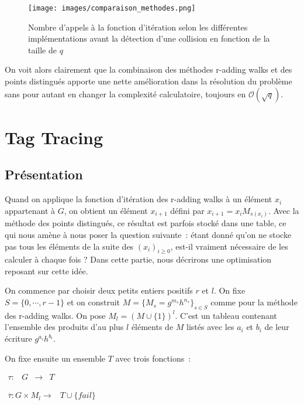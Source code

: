     \begin{figure}
      \center{}
      \texttt{[image: images/comparaison\_methodes.png]}
      \caption{Nombre d'appels à la fonction d'itération selon les différentes implémentations avant la détection d'une collision en fonction de la taille de $q$}
      \label{fig:comparatif}
    \end{figure}

    On voit alors clairement que la combinaison des méthodes r-adding walks et des points distingués apporte une nette amélioration dans la résolution du problème sans pour autant en changer la complexité calculatoire, toujours en $\mathcal{O}(\sqrt{q})$.


    \section{Tag Tracing}
      \subsection{Présentation}
      Quand on applique la fonction d'itération des r-adding walks à un élément $x_i$ appartenant à $G$, on obtient un élément $x_{i+1}$ défini par $x_{i+1} = x_i M_{s(x_i)}$. Avec la méthode des points distingués, ce résultat est parfois stocké dans une table, ce qui nous amène à nous poser la question suivante~: étant donné qu'on ne stocke pas tous les éléments de la suite des $(x_i)_{i \ge 0}$, est-il vraiment nécessaire de les calculer à chaque fois ? Dans cette partie, nous décrirons une optimisation reposant sur cette idée.

      On commence par choisir deux petits entiers positifs $r$ et $l$. On fixe $S=\{0,\cdots,r-1\}$ et on construit $M=\{M_s = g^{m_s} h^{n_s}\}_{s \in S}$ comme pour la méthode des r-adding walks. On pose $M_l = (M\cup\{1\})^l$. C'est un tableau contenant l'ensemble des produits d'au plus $l$ éléments de $M$ listés avec les $a_i$ et $b_i$ de leur écriture $g^{a_i} h^{b_i}$.

      On fixe ensuite un ensemble $T$ avec trois fonctions~:

      $\begin{array}{lrcl}
        \tau : & G & \longrightarrow & T
      \end{array}$

      $\begin{array}{lrcl}
        \overline{\tau} : G \times M_l \longrightarrow & T \cup \{fail\}
      \end{array}$


